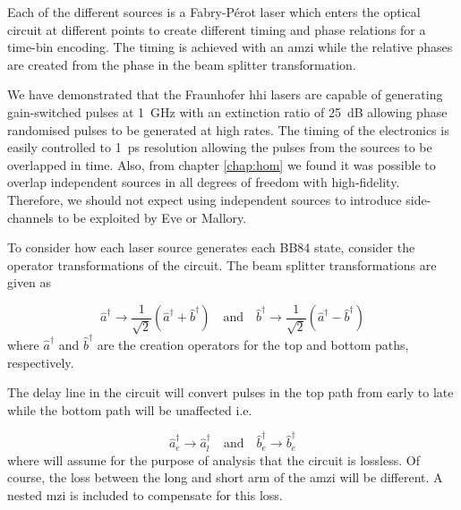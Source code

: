 Each of the different sources is a Fabry-P\'{e}rot laser which enters the optical circuit at different points to create different timing and phase relations for a time-bin encoding. The timing is achieved with an \ac{amzi} while the relative phases are created from the phase in the beam splitter transformation. 

We have demonstrated that the Fraunhofer \ac{hhi} lasers are capable of generating gain-switched pulses at \SI{1}{GHz} with an extinction ratio of \SI{25}{dB} allowing phase randomised pulses to be generated at high rates. The timing of the electronics is easily controlled to \SI{1}{ps} resolution allowing the pulses from the sources to be overlapped in time. Also, from chapter \ref{chap:hom} we found it was possible to overlap independent sources in all degrees of freedom with high-fidelity. Therefore, we should not expect using independent sources to introduce side-channels to be exploited by Eve or Mallory.



To consider how each laser source generates each BB84 state, consider the operator transformations of the circuit. The beam splitter transformations are given as 

\begin{equation}
	\hat{a}^\dagger \rightarrow \frac{1}{\sqrt{2}}\left(\hat{a}^\dagger + \hat{b}^\dagger\right) \quad \text{and} \quad \hat{b}^\dagger \rightarrow \frac{1}{\sqrt{2}}\left(\hat{a}^\dagger - \hat{b}^\dagger\right)
\end{equation}
where $\hat{a}^\dagger$ and $\hat{b}^\dagger$ are the creation operators for the top and bottom paths, respectively.

The delay line in the circuit will convert pulses in the top path from early to late while the bottom path will be unaffected i.e.

\begin{equation}
	\hat{a}^\dagger_e \rightarrow \hat{a}^\dagger_l \quad \text{and} \quad \hat{b}^\dagger_e \rightarrow \hat{b}^\dagger_e
\end{equation}
where will assume for the purpose of analysis that the circuit is lossless. Of course, the loss between the long and short arm of the \ac{amzi} will be different. A nested \ac{mzi} is included to compensate for this loss.

